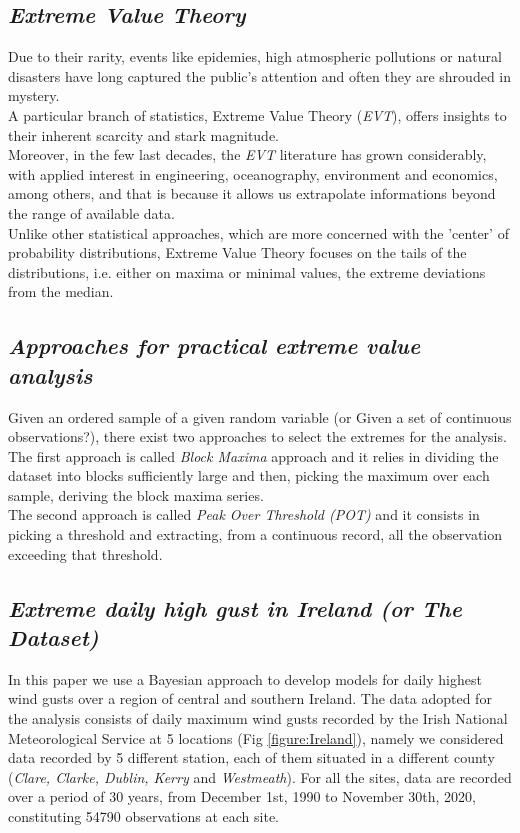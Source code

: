 \documentclass[preprint,12pt]{elsarticle}
\begin{document}
\subsection{\textit{Extreme Value Theory}}
Due to their rarity, events like epidemies, high atmospheric pollutions or natural disasters have long captured the public's attention and often they are shrouded in mystery.\\
A particular branch of statistics, Extreme Value Theory (\textit{EVT}), offers insights to their inherent scarcity and stark magnitude. \\
Moreover, in the few last decades, the \textit{EVT} literature has grown considerably, with applied interest in engineering, oceanography, environment and economics, among others, and that is because it allows us extrapolate informations beyond the range of available data.
\\
Unlike other statistical approaches, which are more concerned with the 'center' of probability distributions, Extreme Value Theory focuses on the tails of the distributions, i.e. either on maxima or minimal values, the extreme deviations from the median.


\subsection{\textit{Approaches for practical extreme value analysis }}
Given an ordered sample of a given random variable (or Given a set of continuous observations?), there exist two approaches to select the extremes for the analysis.
\\ 
The first approach is called \textit{Block Maxima} approach and it relies in dividing the dataset into blocks sufficiently large and then, picking the maximum over each sample, deriving the block maxima series.
\\
The second approach is called \textit{Peak Over Threshold (POT)} and it consists in picking a threshold and extracting, from a continuous record, all the observation exceeding that threshold.

\subsection{\textit{Extreme daily high gust in Ireland (or The Dataset)}}

In this paper we use a Bayesian approach to develop models  for daily highest wind gusts over a region
of central and southern Ireland. The data adopted for the analysis consists of daily maximum wind gusts recorded by the Irish National Meteorological Service at 5 locations (Fig \ref{figure:Ireland}), namely we considered data recorded by 5 different station, each of them situated in a different county (\textit{Clare, Clarke, Dublin, Kerry} and \textit{Westmeath}).  
For all the sites, data are recorded over a period of 30 years, from December 1st, 1990 to November 30th, 2020, constituting 54790 observations at each site.
\end{document}
